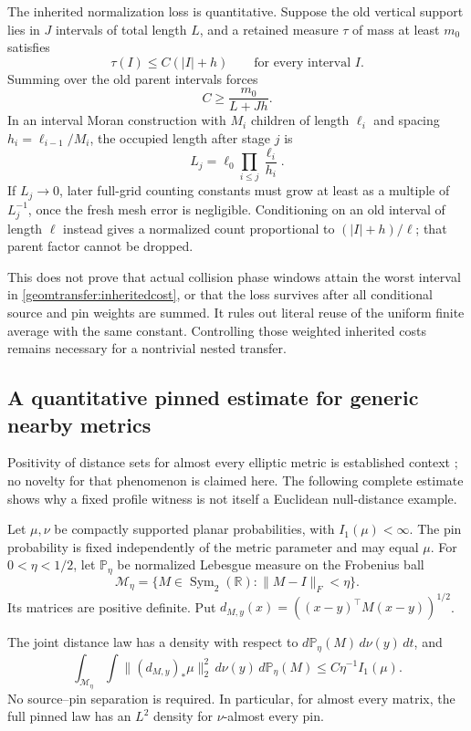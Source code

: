 The inherited normalization loss is quantitative. Suppose the old vertical
support lies in \(J\) intervals of total length \(L\), and a retained
measure \(\tau\) of mass at least \(m_0\) satisfies
\[
 \tau(I)\le C(|I|+h)\qquad\text{for every interval }I.
\]
Summing over the old parent intervals forces
\begin{equation}\label{geomtransfer:inheritedcost}
 C\ge\frac{m_0}{L+Jh}.
\end{equation}
In an interval Moran construction with \(M_i\) children of length
\(\ell_i\) and spacing \(h_i=\ell_{i-1}/M_i\), the occupied length
after stage \(j\) is
\[
 L_j=\ell_0\prod_{i\le j}\frac{\ell_i}{h_i}.
\]
If \(L_j\to0\), later full-grid counting constants must grow at least
as a multiple of \(L_j^{-1}\), once the fresh mesh error is negligible.
Conditioning on an old interval of length \(\ell\) instead gives a
normalized count proportional to \((|I|+h)/\ell\); that parent factor
cannot be dropped.

This does not prove that actual collision phase windows attain the worst
interval in \eqref{geomtransfer:inheritedcost}, or that the loss survives
after all conditional source and pin weights are summed. It rules out
literal reuse of the uniform finite average with the same constant.
Controlling those weighted inherited costs remains necessary for a
nontrivial nested transfer.

\subsection{A quantitative pinned estimate for generic nearby metrics}
\label{geomtransfer:metrics}

Positivity of distance sets for almost every elliptic metric is established
context \cite{hofmanniosevich}; no novelty for that phenomenon is claimed
here. The following complete estimate shows why a fixed profile witness
is not itself a Euclidean null-distance example.

Let \(\mu,\nu\) be compactly supported planar probabilities, with
\(I_1(\mu)<\infty\). The pin probability is fixed independently of the
metric parameter and may equal \(\mu\). For \(0<\eta<1/2\), let
\(\mathbb P_\eta\) be normalized Lebesgue measure on the Frobenius ball
\[
 \mathcal M_\eta=\{M\in\operatorname{Sym}_2(\mathbb R):
                          \|M-I\|_F<\eta\}.
\]
Its matrices are positive definite. Put
\(d_{M,y}(x)=((x-y)^{\top}M(x-y))^{1/2}\).

\begin{proposition}
\label{geomtransfer:metricbound}
The joint distance law has a density with respect to
\(d\mathbb P_\eta(M)\,d\nu(y)\,dt\), and
\begin{equation}\label{geomtransfer:metricnorm}
 \int_{\mathcal M_\eta}\int
       \|(d_{M,y})_*\mu\|_2^2\,d\nu(y)\,d\mathbb P_\eta(M)
 \le C\eta^{-1}I_1(\mu).
\end{equation}
No source--pin separation is required. In particular, for almost every
matrix, the full pinned law has an \(L^2\) density for
\(\nu\)-almost every pin.
\end{proposition}

